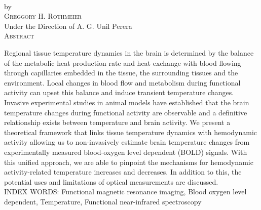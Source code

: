 \thispagestyle{empty}
\begin{center}
  \normalsize
  \textsc{\thesisTitle } \\
  \vspace{0.2in}
  by \\
  \vspace{0.2in}
  \textsc{Greggory H. Rothmeier} \\
  \vspace{0.2in}
  Under the Direction of A. G. Unil Perera\\
  \vspace{0.2in}
  \textsc{Abstract}
  \vspace{0.2in}
\end{center}
    Regional tissue temperature dynamics in the brain is determined by the balance of the metabolic heat production rate and heat exchange with blood flowing through capillaries embedded in the tissue, the surrounding tissues and the environment. Local changes in blood flow and metabolism during functional activity can upset this balance and induce transient temperature changes. Invasive experimental studies in animal models have established that the brain temperature changes during functional activity are observable and a definitive relationship exists between temperature and brain activity. We present a theoretical framework that links tissue temperature dynamics with hemodynamic activity allowing us to non-invasively estimate brain temperature changes from experimentally measured blood-oxygen level dependent (BOLD) signals. With this unified approach, we are able to pinpoint the mechanisms for hemodynamic activity-related temperature increases and decreases.  In addition to this, the potential uses and limitations of optical measurements are discussed.  
\vspace*{\fill}\\
INDEX WORDS: Functional magnetic resonance imaging, Blood oxygen level dependent, Temperature, Functional near-infrared spectroscopy